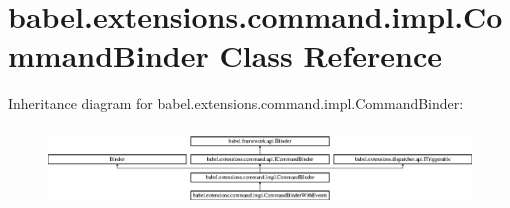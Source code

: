 \hypertarget{classbabel_1_1extensions_1_1command_1_1impl_1_1_command_binder}{\section{babel.\-extensions.\-command.\-impl.\-Command\-Binder Class Reference}
\label{classbabel_1_1extensions_1_1command_1_1impl_1_1_command_binder}
}
Inheritance diagram for babel.\-extensions.\-command.\-impl.\-Command\-Binder\-:\begin{figure}[H]
\begin{center}
\leavevmode
\includegraphics[height=2.103286cm]{classbabel_1_1extensions_1_1command_1_1impl_1_1_command_binder}
\end{center}
\end{figure}
